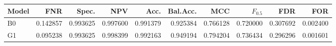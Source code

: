 \begin{tabular}{lrrrrrrrrr}
\toprule
Model & FNR & Spec. & NPV & Acc. & Bal.Acc. & MCC & $F_{0.5}$ & FDR & FOR \\
\midrule
B0 & 0.142857 & 0.993625 & 0.997600 & 0.991379 & 0.925384 & 0.766128 & 0.720000 & 0.307692 & 0.002400 \\
G1 & 0.095238 & 0.993625 & 0.998399 & 0.992163 & 0.949194 & 0.794204 & 0.736434 & 0.296296 & 0.001601 \\
\bottomrule
\end{tabular}
